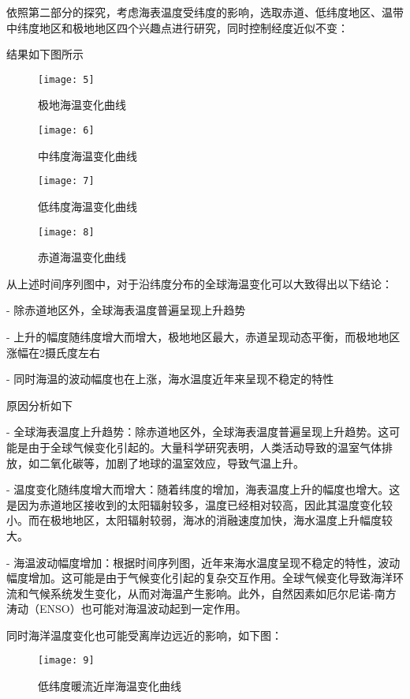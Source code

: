 \documentclass{source/Report}
\begin{document}
依照第二部分的探究，考虑海表温度受纬度的影响，选取赤道、低纬度地区、温带中纬度地区和极地地区四个兴趣点进行研究，同时控制经度近似不变：

结果如下图所示

\begin{figure}[H]
    \centering
    \texttt{[image: 5]}
    \caption{极地海温变化曲线}
\end{figure}

\begin{figure}[H]
    \centering
    \texttt{[image: 6]}
    \caption{中纬度海温变化曲线}
\end{figure}

\begin{figure}[H]
    \centering
    \texttt{[image: 7]}
    \caption{低纬度海温变化曲线}
\end{figure}

\begin{figure}[H]
    \centering
    \texttt{[image: 8]}
    \caption{赤道海温变化曲线}
\end{figure}

从上述时间序列图中，对于沿纬度分布的全球海温变化可以大致得出以下结论：

- 除赤道地区外，全球海表温度普遍呈现上升趋势

- 上升的幅度随纬度增大而增大，极地地区最大，赤道呈现动态平衡，而极地地区涨幅在2摄氏度左右

- 同时海温的波动幅度也在上涨，海水温度近年来呈现不稳定的特性

原因分析如下

- 全球海表温度上升趋势：除赤道地区外，全球海表温度普遍呈现上升趋势。这可能是由于全球气候变化引起的。大量科学研究表明，人类活动导致的温室气体排放，如二氧化碳等，加剧了地球的温室效应，导致气温上升。

- 温度变化随纬度增大而增大：随着纬度的增加，海表温度上升的幅度也增大。这是因为赤道地区接收到的太阳辐射较多，温度已经相对较高，因此其温度变化较小。而在极地地区，太阳辐射较弱，海冰的消融速度加快，海水温度上升幅度较大。

- 海温波动幅度增加：根据时间序列图，近年来海水温度呈现不稳定的特性，波动幅度增加。这可能是由于气候变化引起的复杂交互作用。全球气候变化导致海洋环流和气候系统发生变化，从而对海温产生影响。此外，自然因素如厄尔尼诺-南方涛动（ENSO）也可能对海温波动起到一定作用。

同时海洋温度变化也可能受离岸边远近的影响，如下图：

\begin{figure}[H]
    \centering
    \texttt{[image: 9]}
    \caption{低纬度暖流近岸海温变化曲线}
\end{figure}
\end{document}
